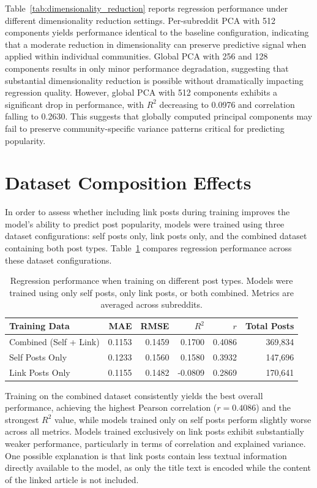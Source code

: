 Table~\ref{tab:dimensionality_reduction} reports regression performance under different dimensionality reduction settings.
Per-subreddit PCA with 512 components yields performance identical to the baseline configuration, indicating that a moderate reduction in dimensionality can preserve predictive signal when applied within individual communities.
Global PCA with 256 and 128 components results in only minor performance degradation, suggesting that substantial dimensionality reduction is possible without dramatically impacting regression quality.
However, global PCA with 512 components exhibits a significant drop in performance, with $R^2$ decreasing to 0.0976 and correlation falling to 0.2630. This suggests that globally computed principal components may fail to preserve community-specific variance patterns critical for predicting popularity.

\section{Dataset Composition Effects}
\label{sec:dataset_composition_results}

In order to assess whether including link posts during training improves the model’s ability to predict post popularity, models were trained using three dataset configurations: self posts only, link posts only, and the combined dataset containing both post types. Table~\ref{tab:dataset_composition} compares regression performance across these dataset configurations.

\begin{table}[htbp]
\centering
\caption{Regression performance when training on different post types. Models were trained using only self posts, only link posts, or both combined. Metrics are averaged across subreddits.}
\label{tab:dataset_composition}
\begin{tabular}{lrrrrr}
\toprule
Training Data & MAE & RMSE & $R^2$ & $r$ & Total Posts \\
\midrule
Combined (Self + Link) & 0.1153 & 0.1459 & 0.1700 & 0.4086 & 369,834 \\
Self Posts Only & 0.1233 & 0.1560 & 0.1580 & 0.3932 & 147,696 \\
Link Posts Only & 0.1155 & 0.1482 & -0.0809 & 0.2869 & 170,641 \\
\bottomrule
\end{tabular}
\end{table}

Training on the combined dataset consistently yields the best overall performance, achieving the highest Pearson correlation ($r=0.4086$) and the strongest $R^2$ value, while models trained only on self posts perform slightly worse across all metrics. Models trained exclusively on link posts exhibit substantially weaker performance, particularly in terms of correlation and explained variance. One possible explanation is that link posts contain less textual information directly available to the model, as only the title text is encoded while the content of the linked article is not included.

